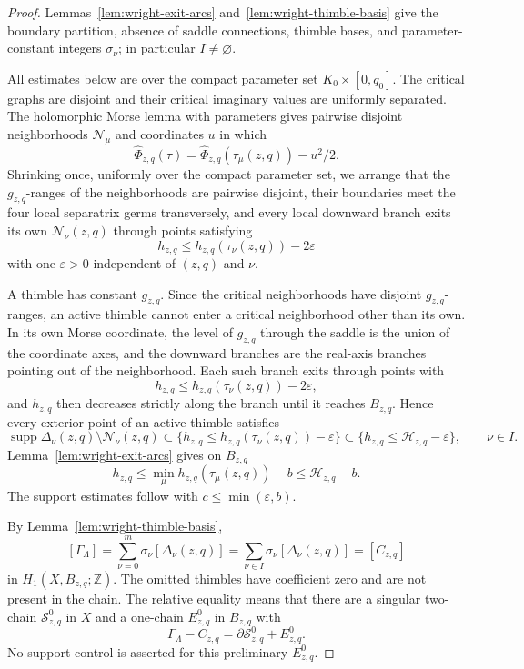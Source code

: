 \documentclass[reqno]{article}
\theoremstyle{definition}
\theoremstyle{remark}
\theoremstyle{plain}
\begin{document}
\begin{proof}
Lemmas~\ref{lem:wright-exit-arcs} and~\ref{lem:wright-thimble-basis} give the boundary partition, absence of saddle connections, thimble bases, and parameter-constant integers $\sigma_\nu$; in particular $I\ne\varnothing$.

All estimates below are over the compact parameter set $K_0\times[0,q_0]$. The critical graphs are disjoint and their critical imaginary values are uniformly separated. The holomorphic Morse lemma with parameters gives pairwise disjoint neighborhoods $\mathcal N_\mu$ and coordinates $u$ in which
$$\widehat\Phi_{z,q}(\tau)=\widehat\Phi_{z,q}(\tau_\mu(z,q))-u^2/2.$$
Shrinking once, uniformly over the compact parameter set, we arrange that the $g_{z,q}$-ranges of the neighborhoods are pairwise disjoint, their boundaries meet the four local separatrix germs transversely, and every local downward branch exits its own $\mathcal N_\nu(z,q)$ through points satisfying
$$h_{z,q}\le h_{z,q}(\tau_\nu(z,q))-2\varepsilon$$
with one $\varepsilon>0$ independent of $(z,q)$ and $\nu$.

A thimble has constant $g_{z,q}$. Since the critical neighborhoods have disjoint $g_{z,q}$-ranges, an active thimble cannot enter a critical neighborhood other than its own. In its own Morse coordinate, the level of $g_{z,q}$ through the saddle is the union of the coordinate axes, and the downward branches are the real-axis branches pointing out of the neighborhood. Each such branch exits through points with
$$h_{z,q}\le h_{z,q}(\tau_\nu(z,q))-2\varepsilon,$$
and $h_{z,q}$ then decreases strictly along the branch until it reaches $B_{z,q}$. Hence every exterior point of an active thimble satisfies
$$\operatorname{supp}\Delta_\nu(z,q)\setminus\mathcal N_\nu(z,q)
\subset\{h_{z,q}\le h_{z,q}(\tau_\nu(z,q))-\varepsilon\}
\subset\{h_{z,q}\le\mathcal H_{z,q}-\varepsilon\},\qquad \nu\in I.$$
Lemma~\ref{lem:wright-exit-arcs} gives on $B_{z,q}$
$$h_{z,q}\le\min_\mu h_{z,q}(\tau_\mu(z,q))-b\le\mathcal H_{z,q}-b.$$
The support estimates follow with $c\le\min(\varepsilon,b)$.

By Lemma~\ref{lem:wright-thimble-basis},
$$[\Gamma_\Lambda]=\sum_{\nu=0}^m\sigma_\nu[\Delta_\nu(z,q)]
=\sum_{\nu\in I}\sigma_\nu[\Delta_\nu(z,q)]
=[C_{z,q}]$$
in $H_1(X,B_{z,q};\mathbb Z)$. The omitted thimbles have coefficient zero and are not present in the chain. The relative equality means that there are a singular two-chain $\mathcal S^0_{z,q}$ in $X$ and a one-chain $E^0_{z,q}$ in $B_{z,q}$ with
$$\Gamma_\Lambda-C_{z,q}=\partial\mathcal S^0_{z,q}+E^0_{z,q}.$$
No support control is asserted for this preliminary $E^0_{z,q}$.


\end{proof}
\end{document}
